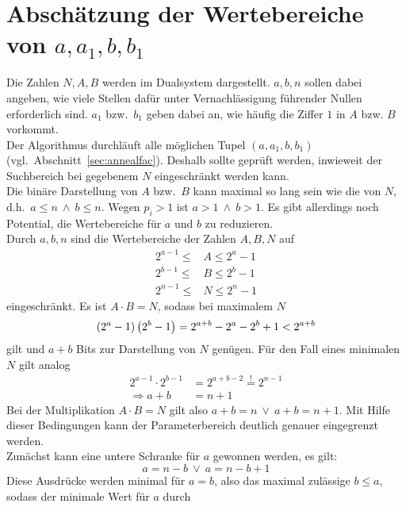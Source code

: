 \section{\texorpdfstring{Abschätzung der Wertebereiche von $a,a_1,b,b_1$}{Abschätzung der Wertebereiche von a, a1, b, b1}}\label{sec:parameterspace}
Die Zahlen $N,A,B$ werden im Dualsystem dargestellt. $a,b,n$ sollen dabei angeben, wie viele Stellen dafür unter Vernachlässigung führender Nullen erforderlich sind. $a_1$ bzw.\ $b_1$ geben dabei an, wie häufig die Ziffer $1$ in $A$ bzw. $B$ vorkommt. \\
Der Algorithmus durchläuft alle möglichen Tupel $\left(a,a_1,b,b_1\right)$ (vgl.\ Abschnitt~\ref{sec:annealfac}). Deshalb sollte geprüft werden, inwieweit der Suchbereich bei gegebenem $N$ eingeschränkt werden kann. \\
Die binäre Darstellung von $A$ bzw.\ $B$ kann maximal so lang sein wie die von $N$, d.h.\ $a\leq n\:\wedge\: b\leq n$. Wegen $p_i > 1$ ist $a>1\:\wedge\:b>1$. Es gibt allerdings noch Potential, die Wertebereiche für $a$ und $b$ zu reduzieren. \\
Durch $a,b,n$ sind die Wertebereiche der Zahlen $A,B,N$ auf
\begin{align*}
		2^{a-1}\leq &A \leq 2^a-1 \\
		2^{b-1}\leq &B \leq 2^b-1 \\
		2^{n-1}\leq &N \leq 2^n-1
\end{align*}
eingeschränkt. Es ist $A\cdot B=N$, sodass bei maximalem $N$
\begin{equation*}
		\left(2^a-1\right)\left(2^b-1\right)=2^{a+b}-2^a-2^b+1<2^{a+b} \\
\end{equation*}
gilt und $a+b$ Bits zur Darstellung von $N$ genügen. Für den Fall eines minimalen $N$ gilt analog
\begin{align*}
		2^{a-1}\cdot 2^{b-1}&=2^{a+b-2}\overset{!}{=}2^{n-1} \\
		\Rightarrow a+b&=n+1
\end{align*}
Bei der Multiplikation $A\cdot B =N$ gilt also $a+b=n\:\vee\:a+b=n+1$. Mit Hilfe dieser Bedingungen kann der Parameterbereich deutlich genauer eingegrenzt werden. \\
Zunächst kann eine untere Schranke für $a$ gewonnen werden, es gilt:
\begin{equation*}
		a=n-b \:\vee\: a=n-b+1
\end{equation*}
Diese Ausdrücke werden minimal für $a=b$, also das maximal zulässige $b \leq a$, sodass der minimale Wert für $a$ durch
